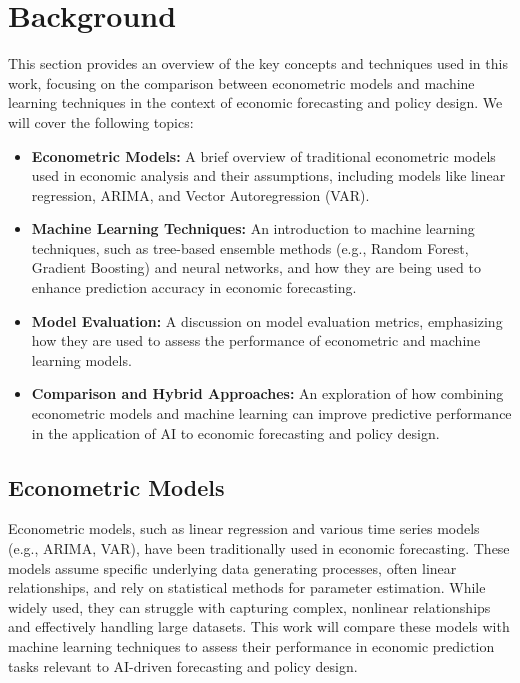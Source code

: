 \chapter{Background}
\justifying
\label{sec:background}

This section provides an overview of the key concepts and techniques used in this work, focusing on the comparison between econometric models and machine learning techniques in the context of economic forecasting and policy design. We will cover the following topics:

\begin{itemize}
    \item \textbf{Econometric Models:} A brief overview of traditional econometric models used in economic analysis and their assumptions, including models like linear regression, ARIMA, and Vector Autoregression (VAR).
    \item \textbf{Machine Learning Techniques:} An introduction to machine learning techniques, such as tree-based ensemble methods (e.g., Random Forest, Gradient Boosting) and neural networks, and how they are being used to enhance prediction accuracy in economic forecasting.
    \item \textbf{Model Evaluation:} A discussion on model evaluation metrics, emphasizing how they are used to assess the performance of econometric and machine learning models.
    \item \textbf{Comparison and Hybrid Approaches:} An exploration of how combining econometric models and machine learning can improve predictive performance in the application of AI to economic forecasting and policy design.
\end{itemize}

\section{Econometric Models}
\label{subsec:econometric_models}
Econometric models, such as linear regression and various time series models (e.g., ARIMA, VAR), have been traditionally used in economic forecasting. These models assume specific underlying data generating processes, often linear relationships, and rely on statistical methods for parameter estimation. While widely used, they can struggle with capturing complex, nonlinear relationships and effectively handling large datasets. This work will compare these models with machine learning techniques to assess their performance in economic prediction tasks relevant to AI-driven forecasting and policy design.


